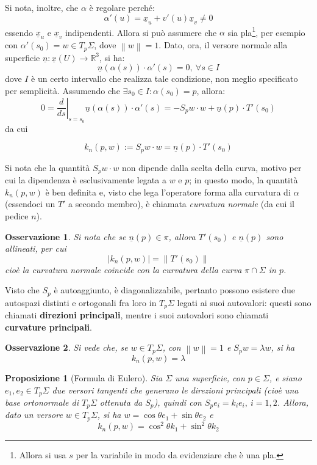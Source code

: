 \documentclass[12pt]{scrartcl}
\theoremstyle{style}
\newtheorem{prop}{Proposizione}[section]
\newtheorem{osservazione}{Osservazione}[section]
\newenvironment{boxenv}[1][]{
    \begin{eqbox}[#1]
    }{
   \end{eqbox}
}
\newcommand*\Eval[3]{\left.#1\right\rvert_{#2}^{#3}}
\numberwithin{equation}{subsection}
\renewcommand{\textbf}[1]{\textsf{\bfseries #1}}
\begin{document}
	Si nota, inoltre, che $\alpha $ \`e regolare perch\'e:
	\[
	\alpha '(u) = \underline{x}_u + v'(u) \underline{x}_v \neq 0 
	\] 
	essendo $\underline{x}_u$ e $\underline{x}_v$ indipendenti. 
Allora si pu\`o assumere che $\alpha $ sia pla\footnote{Allora si usa $s$ per la variabile in modo da evidenziare che \`e una pla.}, per esempio con $\alpha '(s_0) = w \in T_p\Sigma$, dove $\left\lVert w \right\rVert =1$.
Dato, ora, il versore normale alla superficie $\underline{n} : \underline{x}(U) \to \mathbb{R}^3$, si ha:
\[
\underline{n}(\alpha (s)) \cdot \alpha '(s) = 0 , \ \forall s \in I
\] 
dove $I$ \`e un certo intervallo che realizza tale condizione, non meglio specificato per semplicit\`a.
Assumendo che $\exists s_0 \in I : \alpha (s_0) = p$, allora:
\[
		0=\Eval{\frac{d }{d s} }{s = s_0}{} \underline{n}(\alpha (s)) \cdot \alpha '(s) = - S_p w \cdot w + \underline{n}(p) \cdot T'(s_0) 
\] 
da cui
\begin{boxenv}[]
	\begin{equation}
	 k_n(p,w):=S_p w \cdot w= \underline{n}(p) \cdot T'(s_0)
	\end{equation}
\end{boxenv}
Si nota che la quantit\`a $S_p w \cdot w$ non dipende dalla scelta della curva, motivo per cui la dipendenza \`e esclusivamente legata a $w$ e $p$; in questo modo, la quantit\`a $k_n(p,w)$ \`e ben definita e, visto che lega l'operatore forma alla curvatura di $\alpha $ (essendoci un $T'$ a secondo membro), \`e chiamata \textit{curvatura normale} (da cui il pedice $n$).
\begin{osservazione}
Si nota che se $\underline{n}(p) \in \pi$, allora $T'(s_0)$ e $\underline{n}(p)$ sono allineati, per cui 
\[
\lvert k_n(p,w) \rvert =\left\lVert T'(s_0) \right\rVert 
\] 
cio\`e la curvatura normale coincide con la curvatura della curva $\pi \cap \Sigma$ in $p$.
\end{osservazione}
\noindent Visto che $S_p$ \`e autoaggiunto, \`e diagonalizzabile, pertanto possono esistere due autospazi distinti e ortogonali fra loro in $T_p\Sigma$ legati ai suoi autovalori: questi sono chiamati \textbf{direzioni principali}, mentre i suoi autovalori sono chiamati \textbf{curvature principali}.
\begin{osservazione}
Si vede che, se $w \in T_p\Sigma$, con $\left\lVert w \right\rVert =1$ e $S_p w = \lambda w$, si ha
\[
k_n(p,w) = \lambda 
\] 
\end{osservazione}
\begin{prop}
	[Formula di Eulero]
	Sia $\Sigma$ una superficie, con $ p \in \Sigma$, e siano $e_1, e_2 \in T_p\Sigma$ due versori tangenti che generano le direzioni principali (cio\`e una base ortonormale di $T_p\Sigma$ ottenuta da $S_p$), quindi con $S_p e_i = k_i e_i ,\  i=1,2$.
	Allora, dato un versore $w \in T_p\Sigma$, si ha $w = \cos \theta e_1 + \sin \theta  e_2$ e 
	\[
	k_n(p,w) = \cos^2 \theta k_1+\sin^2 \theta k_2
	\] 
\end{prop}
\end{document}
